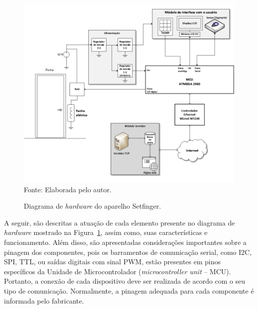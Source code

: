   
\begin{figure}[!t]
  \begin{center}
  \caption{Diagrama de \textit{hardware} do aparelho Setfinger.}
  \includegraphics[scale=0.6]{figuras/cap4/diagrama_hardware.png}\\
  Fonte: Elaborada pelo autor.
  \label{diagrama_hardware}
  \end{center}
  \end{figure}
  
  
  
 A seguir, são descritas a atuação de cada elemento presente no diagrama de \textit{hardware} mostrado na Figura~\ref{diagrama_hardware}, assim como, suas características e funcionamento. Além disso, são apresentadas considerações importantes sobre a pinagem dos componentes, pois os barramentos de comunicação serial, como I2C, SPI, TTL, ou saídas digitais com sinal PWM, estão presentes em pinos específicos da Unidade de Microcontrolador (\textit{microcontroller unit} -- MCU). Portanto, a conexão de cada dispositivo deve ser realizada de acordo com o seu tipo de comunicação. Normalmente, a pinagem adequada para cada componente é informada pelo fabricante.
 
 
